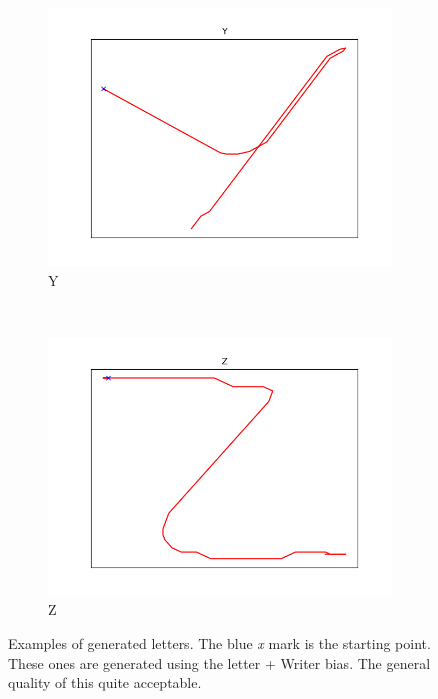 \begin{figure}
\begin{subfigure}[b]{0.14\textwidth}
        \includegraphics[width=\textwidth]{images/gbem/letters_generated/Y.png}
        \caption{Y}
    \end{subfigure}
    ~
    \begin{subfigure}[b]{0.14\textwidth}
        \includegraphics[width=\textwidth]{images/gbem/letters_generated/Z.png}
        \caption{Z}
    \end{subfigure}

    \caption{Examples of generated letters. The blue \textit{x} mark is the starting point. These ones are generated using the letter + Writer bias. The general quality of this quite acceptable.}
    \label{fig:letters_examples_gbem}
\end{figure}



